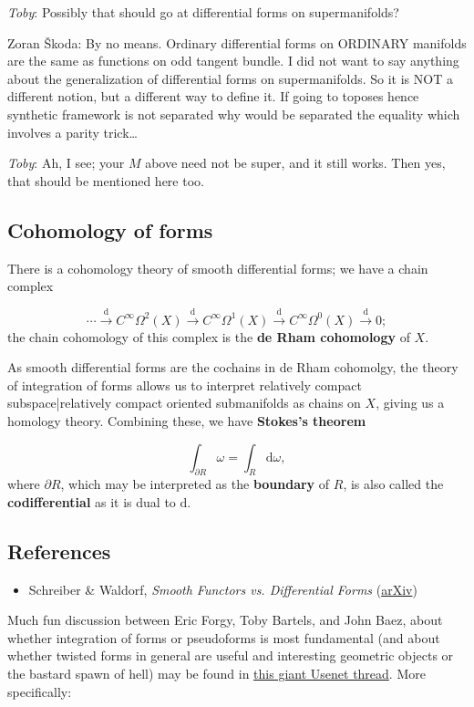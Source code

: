 \documentclass[preprint, 5p, 10pt]{elsarticle}
\theoremstyle{plain}
\begin{document}
\emph{Toby}: Possibly that should go at differential forms on supermanifolds?

Zoran Škoda: By no means. Ordinary differential forms on ORDINARY manifolds are the same as functions on odd tangent bundle. I did not want to say anything about the generalization of differential forms on supermanifolds. So it is NOT a different notion, but a different way to define it. If going to toposes hence synthetic framework is not separated why would be separated the equality which involves a parity trick\ldots{}

\emph{Toby}: Ah, I see; your $M$ above need not be super, and it still works. Then yes, that should be mentioned here too.

\hypertarget{cohomology_of_forms_9}{}\subsection*{{Cohomology of forms}}\label{cohomology_of_forms_9}

There is a cohomology theory of smooth differential forms; we have a chain complex

\begin{displaymath}
\cdots \stackrel{\mathrm{d}}\to C^\infty\Omega^2(X) \stackrel{\mathrm{d}}\to C^\infty\Omega^1(X) \stackrel{\mathrm{d}}\to C^\infty\Omega^0(X) \stackrel{\mathrm{d}}\to 0 ;
\end{displaymath}
the chain cohomology of this complex is the \textbf{de Rham cohomology} of $X$.

As smooth differential forms are the cochains in de Rham cohomolgy, the theory of integration of forms allows us to interpret relatively compact subspace|relatively compact oriented submanifolds as chains on $X$, giving us a homology theory. Combining these, we have \textbf{Stokes'{}s theorem}

\begin{displaymath}
\int_{\partial{R}} \omega = \int_R \mathrm{d}\omega ,
\end{displaymath}
where $\partial{R}$, which may be interpreted as the \textbf{boundary} of $R$, is also called the \textbf{codifferential} as it is dual to $\mathrm{d}$.

\hypertarget{references_10}{}\subsection*{{References}}\label{references_10}

\begin{itemize}%
\item Schreiber \& Waldorf, \emph{Smooth Functors vs. Differential Forms} (\href{http://arxiv.org/abs/0802.0663}{arXiv})

\end{itemize}
Much fun discussion between Eric Forgy, Toby Bartels, and John Baez, about whether integration of forms or pseudoforms is most fundamental (and about whether twisted forms in general are useful and interesting geometric objects or the bastard spawn of hell) may be found in \href{http://groups.google.com/group/sci.physics.research/browse_thread/thread/6a231426b3a313c0/2888a120a9b1f5ad}{this giant Usenet thread}. More specifically:
\end{document}
